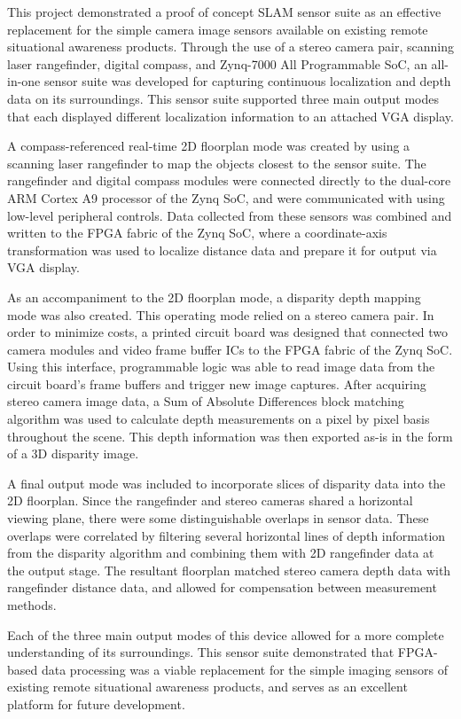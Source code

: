 This project demonstrated a proof of concept SLAM sensor suite as an effective replacement for the simple camera image sensors available on existing remote situational awareness products. Through the use of a stereo camera pair, scanning laser rangefinder,  digital compass, and Zynq-7000 All Programmable SoC, an all-in-one sensor suite was developed for capturing continuous localization and depth data on its surroundings. This sensor suite supported three main output modes that each displayed different localization information to an attached VGA display.
\par
A compass-referenced real-time 2D floorplan mode was created by using a scanning laser rangefinder to map the objects closest to the sensor suite. The rangefinder and digital compass modules were connected directly to the dual-core ARM Cortex A9 processor of the Zynq SoC, and were communicated with using low-level peripheral controls. Data collected from these sensors was combined and written to the FPGA fabric of the Zynq SoC, where a coordinate-axis transformation was used to localize distance data and prepare it for output via VGA display.
\par
As an accompaniment to the 2D floorplan mode, a disparity depth mapping mode was also created. This operating mode relied on a stereo camera pair. In order to minimize costs, a printed circuit board was designed that connected two camera modules and video frame buffer ICs to the FPGA fabric of the Zynq SoC. Using this interface, programmable logic was able to read image data from the circuit board’s frame buffers and trigger new image captures. After acquiring stereo camera image data, a Sum of Absolute Differences block matching algorithm was used to calculate depth measurements on a pixel by pixel basis throughout the scene. This depth information was then exported as-is in the form of a 3D disparity image.
\par
A final output mode was included to incorporate slices of disparity data into the 2D floorplan. Since the rangefinder and stereo cameras shared a horizontal viewing plane, there were some distinguishable overlaps in sensor data. These overlaps were correlated by filtering several horizontal lines of depth information from the disparity algorithm and combining them with 2D rangefinder data at the output stage. The resultant floorplan matched stereo camera depth data with rangefinder distance data, and allowed for compensation between measurement methods.
\par
Each of the three main output modes of this device allowed for a more complete understanding of its surroundings. This sensor suite demonstrated that FPGA-based data processing was a viable replacement for the simple imaging sensors of existing remote situational awareness products, and serves as an excellent platform for future development.

